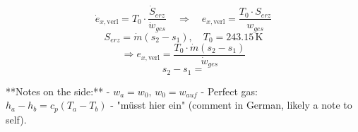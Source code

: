 \[
\dot{e}_{x,\text{verl}} = T_0 \cdot \frac{\dot{S}_{erz}}{\dot{w}_{ges}} \quad \Rightarrow \quad e_{x,\text{verl}} = \frac{T_0 \cdot S_{erz}}{w_{ges}}
\]  
\[
S_{erz} = \dot{m} (s_2 - s_1), \quad T_0 = 243.15 \, \text{K}
\]  
\[
\Rightarrow e_{x,\text{verl}} = \frac{T_0 \cdot \dot{m} (s_2 - s_1)}{\dot{w}_{ges}}
\]  
\[
s_2 - s_1 =
\]  

**Notes on the side:**  
- \( w_a = w_0, \, w_0 = w_{auf} \)  
- Perfect gas: \( h_a - h_b = c_p (T_a - T_b) \)  
- "müsst hier ein" (comment in German, likely a note to self).